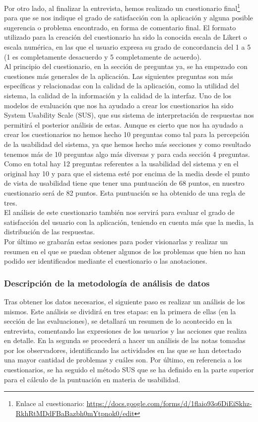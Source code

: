 Por otro lado, al finalizar la entrevista, hemos realizado un cuestionario final\footnote{Enlace al cuestionario: \url{https://docs.google.com/forms/d/1flaio93q6DiEiSkhz-RkhRtMDdFBaBazbh0mYtpnok0/edit}} para que se nos indique el grado de satisfacción con la aplicación y alguna posible 
sugerencia o problema encontrado, en forma de comentario final. El formato utilizado para la creación del cuestionario ha sido la conocida escala de Likert o escala 
numérica, en las que el usuario expresa su grado de concordancia del 1 a 5 (1 es completamente desacuerdo y 5 completamente de acuerdo). \\

Al principio del cuestionario, en la sección de preguntas ya, se ha empezado con cuestiones más generales de la aplicación. Las siguientes preguntas son más 
específicas y relacionadas con la calidad de la aplicación, como la utilidad del sistema, la calidad de la información y la calidad de la interfaz. Uno de los modelos 
de evaluación que nos ha ayudado a crear los cuestionarios ha sido System Usability Scale (SUS), que sus sistema de interpretación de respuestas nos permitirá el 
posterior análisis de estas. Aunque es cierto que nos ha ayudado a crear los cuestionarios no hemos hecho 10 preguntas como tal para la percepción de la usabilidad 
del sistema, ya que hemos hecho más secciones y como resultado tenemos más de 10 preguntas algo más diversas y para cada sección 4 preguntas. Como en total hay 
12 preguntas referentes a la usabilidad del sistema y en el original hay 10 y para que el sistema esté por encima de la media desde el punto de vista 
de usabilidad tiene que tener una puntuación de 68 puntos, en nuestro cuestionario será de 82 puntos. Esta puntuación se ha obtenido de una regla de tres. \\

El análisis de este cuestionario también nos servirá para evaluar el grado de satisfacción del usuario con la aplicación, teniendo en cuenta más que la media, la 
distribución de las respuestas. \\

Por último se grabarán estas sesiones para poder visionarlas y realizar un resumen en el que se puedan obtener algunos de los problemas que bien no han podido ser identificados
mediante el cuestionario o las anotaciones.

\subsubsection{Descripción de la metodología de análisis de datos}
Tras obtener los datos necesarios, el siguiente paso es realizar un análisis de los mismos. Este análisis se dividirá en tres etapas: en la primera de ellas (en la sección de las
evaluaciones), se detallará un resumen de lo acontecido en la entrevista, comentando las expresiones de los usuarios y las acciones que realiza en detalle. En la segunda
se procederá a hacer un análisis de las notas tomadas por los observadores, identificando las actividades en las que se han detectado una mayor cantidad de problemas y 
cuáles son. Por último, en referencia a los cuestionarios, se ha seguido el método SUS que se ha definido en la parte superior para el cálculo de la puntuación en materia
de usabilidad.